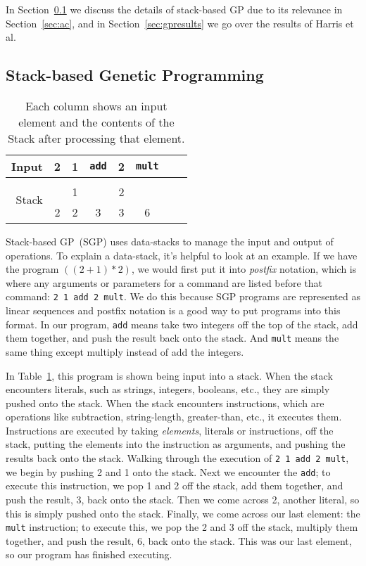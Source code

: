 \documentclass{sig-alternate}
\begin{document}
In Section~\ref{sec:sgp} we discuss the details of stack-based GP due to its relevance in Section~\ref{sec:ac}, and in Section~\ref{sec:gpresults} we go over the results of Harris et al.

\subsection{Stack-based Genetic Programming}
\label{sec:sgp}
\begin{table}
	\centering
	\begin{tabular}{|r|c|c|c|c|c|c|c|}
		\hline
		Input & 2 & 1 & \texttt{add} & 2 & \texttt{mult} \\
		\hline
		\multirow{3}{*}{Stack} & & & & &\\
		&   & 1 &   & 2 &   \\
		& 2 & 2 & 3 & 3 & 6 \\
		\hline
	\end{tabular}
	\caption{Each column shows an input element and the contents of the Stack after processing that element.}
	\label{tab:stacks}
\end{table}

Stack-based GP~(SGP) uses data-stacks to manage the input and output of operations. To explain a data-stack, it's helpful to look at an example. If we have the program $((2+1)*2)$, we would first put it into \textit{postfix} notation, which is where any arguments or parameters for a command are listed before that command: \texttt{2~1~add~2~mult}. We do this because SGP programs are represented as linear sequences and postfix notation is a good way to put programs into this format. In our program, \texttt{add} means take two integers off the top of the stack, add them together, and push the result back onto the stack. And \texttt{mult} means the same thing except multiply instead of add the integers.

In Table~\ref{tab:stacks}, this program is shown being input into a stack. When the stack encounters literals, such as strings, integers, booleans, etc., they are simply pushed onto the stack. When the stack encounters instructions, which are operations like subtraction, string-length, greater-than, etc., it executes them. Instructions are executed by taking \textit{elements}, literals or instructions, off the stack, putting the elements into the instruction as arguments, and pushing the results back onto the stack. Walking through the execution of \texttt{2~1~add~2~mult}, we begin by pushing 2 and 1 onto the stack. Next we encounter the \texttt{add}; to execute this instruction, we pop 1 and 2 off the stack, add them together, and push the result, 3, back onto the stack. Then we come across 2, another literal, so this is simply pushed onto the stack. Finally, we come across our last element: the \texttt{mult} instruction; to execute this, we pop the 2 and 3 off the stack, multiply them together, and push the result, 6, back onto the stack. This was our last element, so our program has finished executing.
\end{document}
